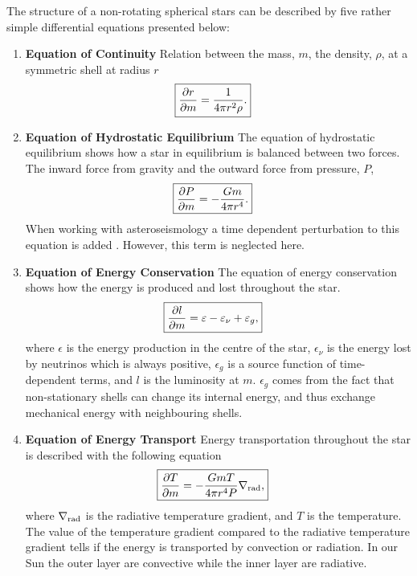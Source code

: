 The structure of a non-rotating spherical stars can be described by five rather simple differential
equations \citep[see e.g.][]{kippenhahn} presented below:
\begin{enumerate}
    \item \textbf{Equation of Continuity}
        \nicebreak
        Relation between the mass, $m$, the density, $\rho$, at a symmetric shell at radius $r$
        \begin{align}
            \Aboxed{\pd{r}{m} &= \frac{1}{4\pi r^2\rho}.}
        \end{align}

    \item \textbf{Equation of Hydrostatic Equilibrium}
        \nicebreak
        The equation of hydrostatic equilibrium shows how a star in equilibrium is balanced between
        two forces. The inward force from gravity and the outward force from pressure, $P$,
        \begin{align}
            \Aboxed{\pd{P}{m} &= -\frac{Gm}{4\pi r^4}.}
        \end{align}
        When working with asteroseismology a time dependent perturbation to this equation is added
        \citep[see e.g.][for a thorough discussion]{Aerts2010}. However, this term is neglected
        here.


    \item \textbf{Equation of Energy Conservation}
        \nicebreak
        The equation of energy conservation shows how the energy is produced and lost throughout the
        star.
        \begin{align}
            \Aboxed{\pd{l}{m} = \epsilon - \epsilon_\nu + \epsilon_g,}
        \end{align}
        where $\epsilon$ is the energy production in the centre of the star, $\epsilon_\nu$ is the
        energy lost by neutrinos which is always positive, $\epsilon_g$ is a source function of
        time-dependent terms, and $l$ is the luminosity at $m$. $\epsilon_g$ comes from the fact
        that non-stationary shells can change its internal energy, and thus exchange mechanical
        energy with neighbouring shells.

    \item \textbf{Equation of Energy Transport}
        \nicebreak
        Energy transportation throughout the star is described with the following equation
        \begin{align}
            \Aboxed{\pd{T}{m} &= -\frac{GmT}{4\pi r^4P}\nabla_\tm{rad},}
        \end{align}
        where $\nabla_{\textnormal{rad}}$ is the radiative temperature gradient, and $T$ is the temperature.
        The value of the temperature gradient compared to the radiative temperature gradient tells
        if the energy is transported by convection or radiation. In our Sun the outer layer are
        convective while the inner layer are radiative.


\end{enumerate}
